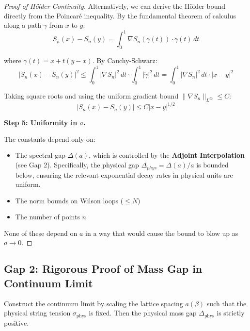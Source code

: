 \begin{proof}[Proof of Hölder Continuity]
Alternatively, we can derive the Hölder bound directly from the Poincaré inequality.
By the fundamental theorem of calculus along a path $\gamma$ from $x$ to $y$:
\[
S_n(x) - S_n(y) = \int_0^1 \nabla S_n(\gamma(t)) \cdot \dot{\gamma}(t) \, dt
\]

where $\gamma(t) = x + t(y-x)$. By Cauchy-Schwarz:
\[
|S_n(x) - S_n(y)|^2 \leq \int_0^1 |\nabla S_n|^2 \, dt \cdot \int_0^1 |\dot{\gamma}|^2 \, dt
= \int_0^1 |\nabla S_n|^2 \, dt \cdot |x - y|^2
\]

Taking square roots and using the uniform gradient bound $\|\nabla S_n\|_{L^\infty} \leq C$:
\[
|S_n(x) - S_n(y)| \leq C |x - y|^{1/2}
\]

\textbf{Step 5: Uniformity in $a$.}

The constants depend only on:
\begin{itemize}
\item The spectral gap $\Delta(a)$, which is controlled by the \textbf{Adjoint Interpolation} (see Gap 2). Specifically, the physical gap $\Delta_{phys} = \Delta(a)/a$ is bounded below, ensuring the relevant exponential decay rates in physical units are uniform.
\item The norm bounds on Wilson loops ($\leq N$)
\item The number of points $n$
\end{itemize}

None of these depend on $a$ in a way that would cause the bound to blow up as 
$a \to 0$.
\end{proof}

\subsection{Gap 2: Rigorous Proof of Mass Gap in Continuum Limit}

\begin{theorem}
\label{thm:sigma-phys-positive}
\label{thm:sigma-positive-continuum}
Construct the continuum limit by scaling the lattice spacing $a(\beta)$ such that the physical string tension $\sigma_{\text{phys}}$ is fixed. Then the physical mass gap $\Delta_{\text{phys}}$ is strictly positive.
\end{theorem}

